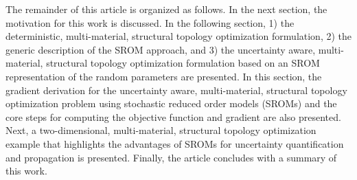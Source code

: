The remainder of this article is organized as follows. In the next section, the motivation for this work is discussed. In the following section, 1) the deterministic, multi-material, structural topology optimization formulation, 2) the generic description of the SROM approach, and 3) the uncertainty aware, multi-material, structural topology optimization formulation based on an SROM representation of the random parameters are presented. In this section, the gradient derivation for the uncertainty aware, multi-material, structural topology optimization problem using stochastic reduced order models (SROMs) and the core steps for computing the objective function and gradient are also presented. Next, a two-dimensional, multi-material, structural topology optimization example that highlights the advantages of SROMs for uncertainty quantification and propagation is presented. Finally, the article concludes with a summary of this work.
